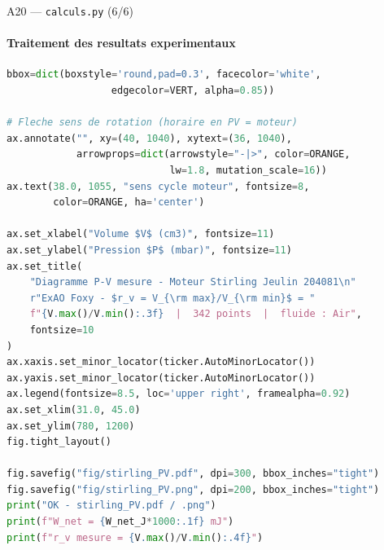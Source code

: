 \documentclass[aspectratio=43, 10pt]{beamer}
\begin{document}
\begin{frame}[fragile]{A20 --- \texttt{calculs.py} (6/6)}
  \framesubtitle{Traitement des resultats experimentaux}
  \begin{exampleblock}{}
  \begin{lstlisting}[language=Python, basicstyle=\tiny\ttfamily]
        bbox=dict(boxstyle='round,pad=0.3', facecolor='white',
                  edgecolor=VERT, alpha=0.85))

# Fleche sens de rotation (horaire en PV = moteur)
ax.annotate("", xy=(40, 1040), xytext=(36, 1040),
            arrowprops=dict(arrowstyle="-|>", color=ORANGE,
                            lw=1.8, mutation_scale=16))
ax.text(38.0, 1055, "sens cycle moteur", fontsize=8,
        color=ORANGE, ha='center')

ax.set_xlabel("Volume $V$ (cm3)", fontsize=11)
ax.set_ylabel("Pression $P$ (mbar)", fontsize=11)
ax.set_title(
    "Diagramme P-V mesure - Moteur Stirling Jeulin 204081\n"
    r"ExAO Foxy - $r_v = V_{\rm max}/V_{\rm min}$ = "
    f"{V.max()/V.min():.3f}  |  342 points  |  fluide : Air",
    fontsize=10
)
ax.xaxis.set_minor_locator(ticker.AutoMinorLocator())
ax.yaxis.set_minor_locator(ticker.AutoMinorLocator())
ax.legend(fontsize=8.5, loc='upper right', framealpha=0.92)
ax.set_xlim(31.0, 45.0)
ax.set_ylim(780, 1200)
fig.tight_layout()

fig.savefig("fig/stirling_PV.pdf", dpi=300, bbox_inches="tight")
fig.savefig("fig/stirling_PV.png", dpi=200, bbox_inches="tight")
print("OK - stirling_PV.pdf / .png")
print(f"W_net = {W_net_J*1000:.1f} mJ")
print(f"r_v mesure = {V.max()/V.min():.4f}")
  \end{lstlisting}
  \end{exampleblock}
\end{frame}
\end{document}
